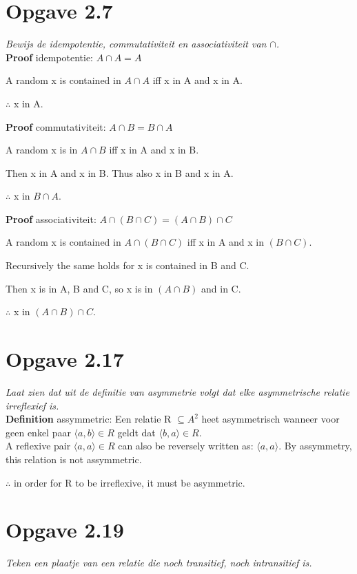 \documentclass[11pt]{article}
\begin{document}
\section*{Opgave 2.7}
\textit{Bewijs de idempotentie, commutativiteit en associativiteit van
$ \cap $.}
\\

\textbf{Proof} idempotentie: $ A \cap A = A $

A random x is contained in $ A \cap A $ iff x in A and x in A.

$ \therefore $ x in A.

\textbf{Proof} commutativiteit: $ A \cap B = B \cap A $

A random x is in $ A \cap B $ iff x in A and x in B.

Then x in A and x in B. Thus also x in B and x in A.

$ \therefore $ x in $ B \cap A $.

\textbf{Proof} associativiteit: $ A \cap (B \cap C) = (A \cap B) \cap C $

A random x is contained in $ A \cap (B \cap C) $ iff x in A and x in
$ (B \cap C) $.

Recursively the same holds for x is contained in B and C.

Then x is in A, B and C, so x is in $ (A \cap B) $ and in C.

$ \therefore $ x in $ (A \cap B) \cap C $.


\section*{Opgave 2.17}
\textit{Laat zien dat uit de definitie van asymmetrie volgt dat elke asymmetrische relatie irreflexief is.}
\\

\textbf{Definition} assymmetric: Een relatie R $ \subseteq A^2 $ heet asymmetrisch wanneer voor geen enkel paar $ \langle a, b \rangle \in R $ geldt dat $ \langle b, a \rangle \in R $.
\\

A reflexive pair $ \langle a, a \rangle \in R $ can also be reversely written as: $ \langle a, a \rangle $. By assymmetry, this relation is not assymmetric.

$ \therefore $ in order for R to be irreflexive, it must be asymmetric.


\section*{Opgave 2.19}
\textit{Teken een plaatje van een relatie die noch transitief, noch intransitief is.}
\\
\end{document}
